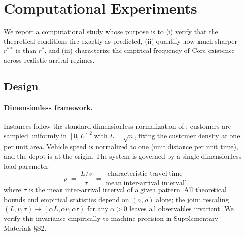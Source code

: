 \documentclass[11pt]{article}
\theoremstyle{plain}
\theoremstyle{definition}
\theoremstyle{remark}
\begin{document}
\section{Computational Experiments}
\label{sec:experiments}

We report a computational study whose purpose is to (i) verify that the theoretical conditions fire exactly as predicted, (ii) quantify how much sharper $r^{\ast\ast}$ is than $r^{\ast}$, and (iii) characterize the empirical frequency of Core existence across realistic arrival regimes.

\subsection{Design}
\label{ssec:design}

\paragraph{Dimensionless framework.} Instances follow the standard dimensionless normalization of \citet{steele1997probability}: customers are sampled uniformly in $[0,L]^2$ with $L=\sqrt{n}$, fixing the customer density at one per unit area. Vehicle speed is normalized to one (unit distance per unit time), and the depot is at the origin. The system is governed by a single dimensionless load parameter
\[
  \rho \;=\; \frac{L/v}{\tau} \;=\; \frac{\text{characteristic travel time}}{\text{mean inter-arrival interval}},
\]
where $\tau$ is the mean inter-arrival interval of a given pattern. All theoretical bounds and empirical statistics depend on $(n,\rho)$ alone; the joint rescaling $(L,v,\tau)\to(\alpha L,\alpha v,\alpha\tau)$ for any $\alpha>0$ leaves all observables invariant. We verify this invariance empirically to machine precision in Supplementary Materials \S S2.
\end{document}
